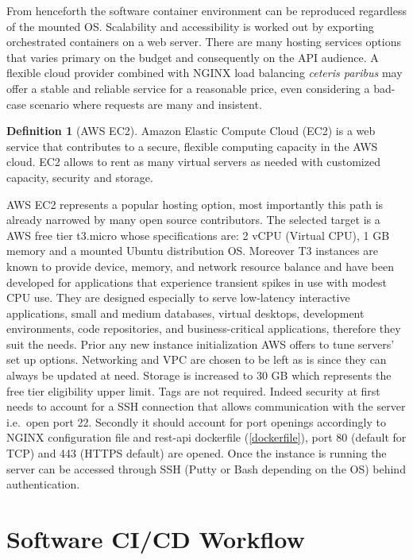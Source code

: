 \documentclass[
  12pt,
  a4paper,
  oneside]{book}
\theoremstyle{definition}
\newtheorem{definition}{Definition}[chapter]
\theoremstyle{definition}
\theoremstyle{definition}
\theoremstyle{remark}
\begin{document}
From henceforth the software container environment can be reproduced regardless of the mounted OS. Scalability and accessibility is worked out by exporting orchestrated containers on a web server. There are many hosting services options that varies primary on the budget and consequently on the API audience. A flexible cloud provider combined with NGINX load balancing \emph{ceteris paribus} may offer a stable and reliable service for a reasonable price, even considering a bad-case scenario where requests are many and insistent.
\begin{definition}[AWS EC2]
\protect\hypertarget{def:aws}{}{\label{def:aws} {} }Amazon Elastic Compute Cloud (EC2) is a web service that contributes to a secure, flexible computing capacity in the AWS cloud. EC2 allows to rent as many virtual servers as needed with customized capacity, security and storage.
\end{definition}

AWS EC2 represents a popular hosting option, most importantly this path is already narrowed by many open source contributors. The selected target is a AWS free tier t3.micro whose specifications are: 2 vCPU (Virtual CPU), 1 GB memory and a mounted Ubuntu distribution OS. Moreover T3 instances are known to provide device, memory, and network resource balance and have been developed for applications that experience transient spikes in use with modest CPU use. They are designed especially to serve low-latency interactive applications, small and medium databases, virtual desktops, development environments, code repositories, and business-critical applications, therefore they suit the needs.
Prior any new instance initialization AWS offers to tune servers' set up options. Networking and VPC are chosen to be left as is since they can always be updated at need. Storage is increased to 30 GB which represents the free tier eligibility upper limit. Tags are not required. Indeed security at first needs to account for a SSH connection that allows communication with the server i.e.~open port 22. Secondly it should account for port openings accordingly to NGINX configuration file and rest-api dockerfile (\ref{dockerfile}), port 80 (default for TCP) and 443 (HTTPS default) are opened. Once the instance is running the server can be accessed through SSH (Putty or Bash depending on the OS) behind authentication.

\hypertarget{sdwf}{%
\section{Software CI/CD Workflow}\label{sdwf}}
\end{document}

